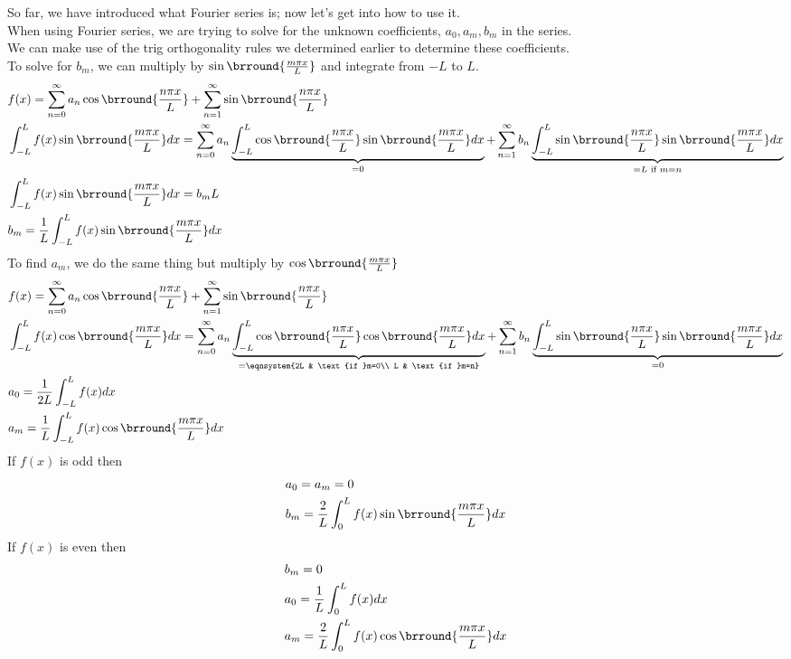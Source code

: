 So far, we have introduced what Fourier series is; now let's get into how to use it.\\
When using Fourier series, we are trying to solve for the unknown coefficients, $a_0,a_m,b_m$ in the series.\\
We can make use of the trig orthogonality rules we determined earlier to determine these coefficients.\\
To solve for $b_m$, we can multiply by $\sin\brround{\frac{m\pi x}{L}}$ and integrate from $-L$ to $L$.
\begin{align*}
    &f(x)=\sum_{n=0}^\infty a_n\cos\brround{\frac{n\pi x}{L}}+\sum_{n=1}^\infty\sin\brround{\frac{n\pi x}{L}}\\
    &\int_{-L}^L f(x)\sin\brround{\frac{m\pi x}{L}}dx=\sum_{n=0}^\infty a_n\underbrace{\int_{-L}^L\cos\brround{\frac{n\pi x}{L}}\sin\brround{\frac{m\pi x}{L}}dx}_{=0}+\sum_{n=1}^\infty b_n\underbrace{\int_{-L}^L\sin\brround{\frac{n\pi x}{L}}\sin\brround{\frac{m\pi x}{L}}dx}_{=L\text{ if }m=n}\\
    &\int_{-L}^Lf(x)\sin\brround{\frac{m\pi x}{L}}dx=b_mL\\
    &b_m=\frac{1}{L}\int_{-L}^L f(x)\sin\brround{\frac{m\pi x}{L}}dx
\end{align*}
To find $a_m$, we do the same thing but multiply by $\cos\brround{\frac{m\pi x}{L}}$
\begin{align*}
    &f(x)=\sum_{n=0}^\infty a_n\cos\brround{\frac{n\pi x}{L}}+\sum_{n=1}^\infty\sin\brround{\frac{n\pi x}{L}}\\
    &\int_{-L}^Lf(x)\cos\brround{\frac{m\pi x}{L}}dx=\sum_{n=0}^\infty a_n\underbrace{\int_{-L}^L\cos\brround{\frac{n\pi x}{L}}\cos\brround{\frac{m\pi x}{L}}dx}_{=\eqnsystem{2L & \text{if }m=0\\ L & \text{if }m=n}}+\sum_{n=1}^\infty b_n\underbrace{\int_{-L}^L\sin\brround{\frac{n\pi x}{L}}\sin\brround{\frac{m\pi x}{L}}dx}_{=0}\\
    &a_0=\frac{1}{2L}\int_{-L}^L f(x)dx\\
    &a_m=\frac{1}{L}\int_{-L}^L f(x)\cos\brround{\frac{m\pi x}{L}}dx
\end{align*}
If $f(x)$ is odd then
\begin{align*}
    &a_0=a_m=0\\
    &b_m=\frac{2}{L}\int_0^L f(x)\sin\brround{\frac{m\pi x}{L}}dx
\end{align*}
If $f(x)$ is even then
\begin{align*}
    &b_m=0\\
    &a_0=\frac{1}{L}\int_0^L f(x)dx\\
    &a_m=\frac{2}{L}\int_0^L f(x)\cos\brround{\frac{m\pi x}{L}}dx
\end{align*}
